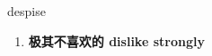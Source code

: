 
\begin{frame}
{\huge despise}
\begin{center}
\begin{enumerate}\Large
  \item \textbf{极其不喜欢的 dislike strongly}
\end{enumerate}
\end{center}
\end{frame}
